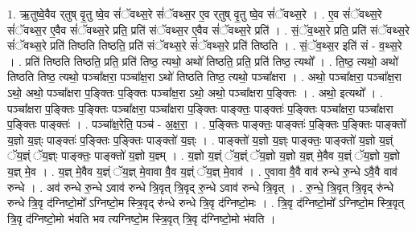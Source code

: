 \documentclass[17pt]{extarticle}
\begin{document}
1. ऋ॒तुष्वे॒वैव र्‌तुष् वृ॒तु ष्वे॒व सं॑ॅवथ्स॒रे सं॑ॅवथ्स॒र ए॒व र्‌तुष् वृ॒तु ष्वे॒व सं॑ॅवथ्स॒रे । . ए॒व सं॑ॅवथ्स॒रे सं॑ॅवथ्स॒र ए॒वैव सं॑ॅवथ्स॒रे प्रति॒ प्रति॑ संॅवथ्स॒र ए॒वैव सं॑ॅवथ्स॒रे प्रति॑ । . सं॒ॅव॒थ्स॒रे प्रति॒ प्रति॑ संॅवथ्स॒रे सं॑ॅवथ्स॒रे प्रति॑ तिष्ठति तिष्ठति॒ प्रति॑ संॅवथ्स॒रे सं॑ॅवथ्स॒रे प्रति॑ तिष्ठति । . सं॒ॅव॒थ्स॒र इति॑ सं - व॒थ्स॒रे । . प्रति॑ तिष्ठति तिष्ठति॒ प्रति॒ प्रति॑ तिष्ठ॒ त्यथो॒ अथो॑ तिष्ठति॒ प्रति॒ प्रति॑ तिष्ठ॒ त्यथो᳚ । . ति॒ष्ठ॒ त्यथो॒ अथो॑ तिष्ठति तिष्ठ॒ त्यथो॒ पञ्चा᳚क्षरा॒ पञ्चा᳚क्ष॒रा ऽथो॑ तिष्ठति तिष्ठ॒ त्यथो॒ पञ्चा᳚क्षरा । . अथो॒ पञ्चा᳚क्षरा॒ पञ्चा᳚क्ष॒रा ऽथो॒ अथो॒ पञ्चा᳚क्षरा प॒ङ्क्तिः प॒ङ्क्तिः पञ्चा᳚क्ष॒रा ऽथो॒ अथो॒ पञ्चा᳚क्षरा प॒ङ्क्तिः । . अथो॒ इत्यथो᳚ । . पञ्चा᳚क्षरा प॒ङ्क्तिः प॒ङ्क्तिः पञ्चा᳚क्षरा॒ पञ्चा᳚क्षरा प॒ङ्क्तिः पाङ्क्तः॒ पाङ्क्तः॑ प॒ङ्क्तिः पञ्चा᳚क्षरा॒ पञ्चा᳚क्षरा प॒ङ्क्तिः पाङ्क्तः॑ । . पञ्चा᳚क्ष॒रेति॒ पञ्च॑ - अ॒क्ष॒रा॒ । . प॒ङ्क्तिः पाङ्क्तः॒ पाङ्क्तः॑ प॒ङ्क्तिः प॒ङ्क्तिः पाङ्क्तो॑ य॒ज्ञो य॒ज्ञ्ः पाङ्क्तः॑ प॒ङ्क्तिः प॒ङ्क्तिः पाङ्क्तो॑ य॒ज्ञ्ः । . पाङ्क्तो॑ य॒ज्ञो य॒ज्ञ्ः पाङ्क्तः॒ पाङ्क्तो॑ य॒ज्ञो य॒ज्ञ्ं ॅय॒ज्ञ्ं ॅय॒ज्ञ्ः पाङ्क्तः॒ पाङ्क्तो॑ य॒ज्ञो य॒ज्ञ्म् । . य॒ज्ञो य॒ज्ञ्ं ॅय॒ज्ञ्ं ॅय॒ज्ञो य॒ज्ञो य॒ज्ञ् मे॒वैव य॒ज्ञ्ं ॅय॒ज्ञो य॒ज्ञो य॒ज्ञ् मे॒व । . य॒ज्ञ् मे॒वैव य॒ज्ञ्ं ॅय॒ज्ञ् मे॒वावा वै॒व य॒ज्ञ्ं ॅय॒ज्ञ् मे॒वाव॑ । . ए॒वावा वै॒वै वाव॑ रुन्धे रु॒न्धे ऽवै॒वै वाव॑ रुन्धे । . अव॑ रुन्धे रु॒न्धे ऽवाव॑ रुन्धे त्रि॒वृत् त्रि॒वृद् रु॒न्धे ऽवाव॑ रुन्धे त्रि॒वृत् । . रु॒न्धे॒ त्रि॒वृत् त्रि॒वृद् रु॑न्धे रुन्धे त्रि॒वृ द॑ग्निष्टो॒मो᳚ ऽग्निष्टो॒म स्त्रि॒वृद् रु॑न्धे रुन्धे त्रि॒वृ द॑ग्निष्टो॒मः । . त्रि॒वृ द॑ग्निष्टो॒मो᳚ ऽग्निष्टो॒म स्त्रि॒वृत् त्रि॒वृ द॑ग्निष्टो॒मो भ॑वति भव त्यग्निष्टो॒म स्त्रि॒वृत् त्रि॒वृ द॑ग्निष्टो॒मो भ॑वति । \newline
\end{document}
